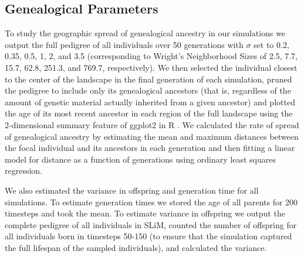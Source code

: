 \documentclass[9pt,twocolumn,twoside,lineno]{gsajnl}
\begin{document}

\subsection{Genealogical Parameters}
To study the geographic spread of genealogical ancestry in our simulations we output the full pedigree of all individuals over 50 generations with $\sigma$ set to 0.2, 0.35, 0.5, 1, 2, and 3.5 (corresponding to Wright's Neighborhood Sizes of 2.5, 7.7, 15.7, 62.8, 251.3, and 769.7, respectively). We then selected the individual closest to the center of the landscape in the final generation of each simulation, pruned the pedigree to include only its genealogical ancestors (that is, regardless of the amount of genetic material actually inherited from a given ancestor) and plotted the age of its most recent ancestor in each region of the full landscape using the 2-dimensional summary feature of ggplot2 in R \citep{Wickham2016}. We calculated the rate of spread of genealogical ancestry by estimating the mean and maximum distances between the focal individual and its ancestors in each generation and then fitting a linear model for distance as a function of generations using ordinary least squares regression. 

We also estimated the variance in offspring and generation time for all simulations. To estimate generation times we stored the age of all parents for 200 timesteps and took the mean. To estimate variance in offspring we output the complete pedigree of all individuals in SLiM, counted the number of offspring for all individuals born in timesteps 50-150 (to ensure that the simulation captured the full lifespan of the sampled individuals), and calculated the variance. 
\end{document}
